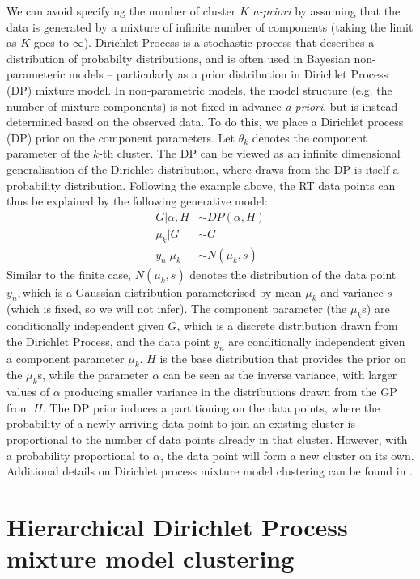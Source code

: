 We can avoid specifying the number of cluster $K$ \emph{a-priori }by assuming that the data is generated by a mixture of infinite number of components (taking the limit as $K$ goes to $\infty$). Dirichlet Process is a stochastic process that describes a distribution of probabilty distributions, and is often used in Bayesian non-parameteric models -- particularly as a prior distribution in Dirichlet Process (DP) mixture model. In non-parametric models, the model structure (e.g. the number of mixture components) is not fixed in advance \textit{a priori}, but is instead determined based on the observed data. To do this, we place a Dirichlet process (DP) prior on the component parameters. Let $\theta_{k}$ denotes the component parameter of the $k$-th cluster. The DP can be viewed as an infinite dimensional generalisation of the Dirichlet distribution, where draws from the DP is itself a probability distribution. Following the example above, the RT data points can thus be explained by the following generative model:
\begin{align}
G|\alpha,H & \sim DP(\alpha,H)\\
\mu_{k}|G & \sim G\\
y_{n}|\mu_{k} & \sim{N}(\mu_{k},s)
\end{align}
Similar to the finite case, ${N}(\mu_{k},s)$ denotes the distribution of the data point $y_{n},$which is a Gaussian distribution parameterised by mean $\mu_{k}$ and variance $s$ (which is fixed, so we will not infer). The component parameter (the $\mu_{k}$s) are conditionally independent given $G$, which is a discrete distribution drawn from the Dirichlet Process, and the data point $y_{n}$ are conditionally independent given a component parameter $\mu_{k}$. $H$ is the base distribution that provides the prior on the $\mu_{k}$s, while the parameter $\alpha$ can be seen as the inverse variance, with larger values of $\alpha$ producing smaller variance in the distributions drawn from the GP from $H$. The DP prior induces a partitioning on the data points, where the probability of a newly arriving data point to join an existing cluster is proportional to the number of data points already in that cluster. However, with a probability proportional to $\alpha$, the data point will form a new cluster on its own. Additional details on Dirichlet process mixture model clustering can be found in \cite{Rasmussen2000}. 

\section{Hierarchical Dirichlet Process mixture model clustering}

